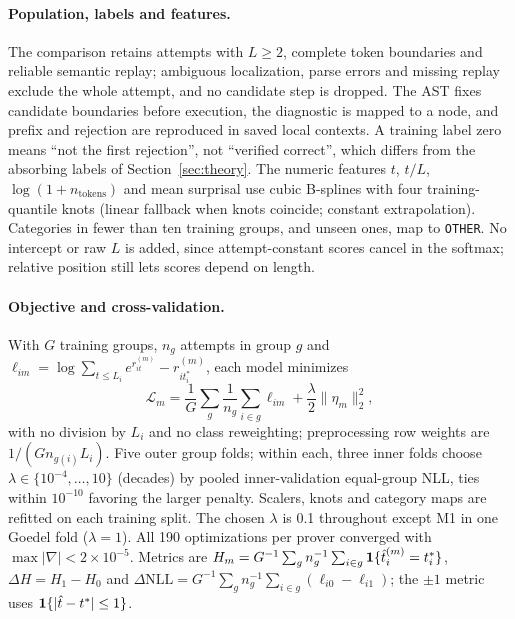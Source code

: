 \paragraph{Population, labels and features.} The comparison retains attempts with $L\ge2$, complete token boundaries and reliable semantic replay; ambiguous localization, parse errors and missing replay exclude the whole attempt, and no candidate step is dropped. The AST fixes candidate boundaries before execution, the diagnostic is mapped to a node, and prefix and rejection are reproduced in saved local contexts. A training label zero means ``not the first rejection'', not ``verified correct'', which differs from the absorbing labels of Section~\ref{sec:theory}. The numeric features $t$, $t/L$, $\log(1+n_{\mathrm{tokens}})$ and mean surprisal use cubic B-splines with four training-quantile knots (linear fallback when knots coincide; constant extrapolation). Categories in fewer than ten training groups, and unseen ones, map to \texttt{OTHER}. No intercept or raw $L$ is added, since attempt-constant scores cancel in the softmax; relative position still lets scores depend on length.

\paragraph{Objective and cross-validation.} With $G$ training groups, $n_g$ attempts in group $g$ and $\ell_{im}=\log\sum_{t\le L_i}e^{r_{it}^{(m)}}-r_{it_i^*}^{(m)}$, each model minimizes
\begin{equation}\label{eq:objective}
\mathcal L_m=\frac1G\sum_g\frac1{n_g}\sum_{i\in g}\ell_{im}+\frac\lambda2\|\eta_m\|_2^2,
\end{equation}
with no division by $L_i$ and no class reweighting; preprocessing row weights are $1/(Gn_{g(i)}L_i)$. Five outer group folds; within each, three inner folds choose $\lambda\in\{10^{-4},\dots,10\}$ (decades) by pooled inner-validation equal-group NLL, ties within $10^{-10}$ favoring the larger penalty. Scalers, knots and category maps are refitted on each training split. The chosen $\lambda$ is 0.1 throughout except M1 in one Goedel fold ($\lambda=1$). All 190 optimizations per prover converged with $\max|\nabla|<2\times10^{-5}$. Metrics are $H_m=G^{-1}\sum_gn_g^{-1}\sum_{i\in g}\mathbf{1}\{\hat t_i^{(m)}=t_i^*\}$, $\Delta H=H_1-H_0$ and $\Delta\mathrm{NLL}=G^{-1}\sum_gn_g^{-1}\sum_{i\in g}(\ell_{i0}-\ell_{i1})$; the $\pm1$ metric uses $\mathbf{1}\{|\hat t-t^*|\le1\}$.

